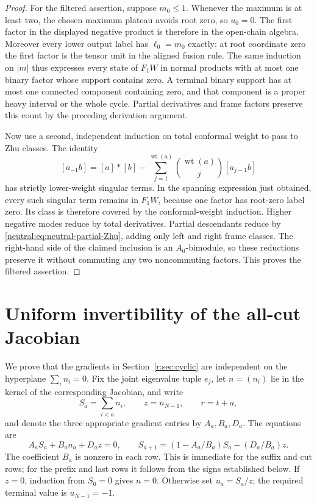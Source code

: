 \documentclass[11pt,a4paper]{article}
\numberwithin{equation}{section}
\theoremstyle{definition}\newtheorem{definition}[theorem]{Definition}
\theoremstyle{remark}\newtheorem{remark}[theorem]{Remark}
\begin{document}
\begin{proof}
For the filtered assertion, suppose $m_0\leq1$.  Whenever the maximum
is at least two, the chosen maximum plateau avoids root zero, so
$u_0=0$.  The first factor in the displayed negative product is
therefore in the open-chain algebra.  Moreover every lower output
label has $\ell_0=m_0$ exactly: at root coordinate zero the first
factor is the tensor unit in the aligned fusion rule.  The same
induction on $|m|$ thus expresses every state of $F_1W$ in normal
products with at most one binary factor whose support contains zero.
A terminal binary support has at most one connected component
containing zero, and that component is a proper heavy interval or
the whole cycle.  Partial derivatives and frame factors preserve
this count by the preceding derivation argument.

Now use a second, independent induction on total conformal weight
to pass to Zhu classes.  The identity
\[
 [a_{-1}b]=[a]*[b]-\sum_{j=1}^{\operatorname{wt}(a)}
          \binom{\operatorname{wt}(a)}j[a_{j-1}b]
\]
has strictly lower-weight singular terms.  In the spanning expression
just obtained, every such singular term remains in $F_1W$, because
one factor has root-zero label zero.  Its class is therefore covered
by the conformal-weight induction.  Higher negative modes reduce by
total derivatives.  Partial descendants reduce by
\eqref{neutral:eq:neutral-partial-Zhu}, adding only left and right
frame classes.  The right-hand side of the claimed inclusion is an
$A_0$-bimodule, so these reductions preserve it without commuting any
two noncommuting factors.  This proves the filtered assertion.
\end{proof}



\section{Uniform invertibility of the all-cut Jacobian}
\label{r:app:jac}

We prove that the gradients in Section~\ref{r:sec:cyclic} are
independent on the hyperplane \(\sum_i n_i=0\).  Fix the joint
eigenvalue tuple \(e_j\), let \(n=(n_i)\) lie in the kernel of the
corresponding Jacobian, and write
\[
 S_a=\sum_{i<a}n_i,\qquad z=n_{N-1},\qquad r=t+a,
\]
and denote the three appropriate gradient entries by \(A_a,B_a,D_a\).
The equations are
\[
 A_aS_a+B_an_a+D_az=0,\qquad
 S_{a+1}=(1-A_a/B_a)S_a-(D_a/B_a)z.
\]
The coefficient \(B_a\) is nonzero in each row.  This is immediate
for the suffix and cut rows; for the prefix and last rows it follows
from the signs established below.
If \(z=0\), induction from \(S_0=0\) gives \(n=0\).
Otherwise set \(u_a=S_a/z\); the required terminal value is
\(u_{N-1}=-1\).
\end{document}

